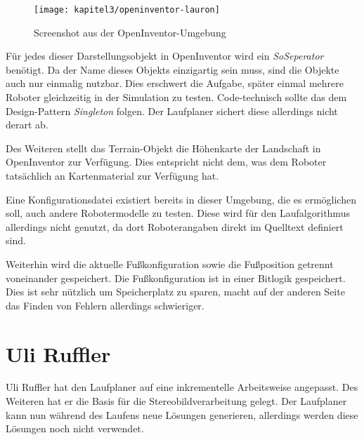\begin{figure}[t!]
  \centering
  \texttt{[image: kapitel3/openinventor-lauron]}
  \caption{Screenshot aus der OpenInventor-Umgebung}
  \label{Kap4:OpenInventorLauron}
\end{figure}

Für jedes dieser Darstellungsobjekt in OpenInventor wird ein \emph{SoSeperator} benötigt. Da der Name dieses Objekts einzigartig sein muss, sind die Objekte auch nur einmalig nutzbar. Dies erschwert die Aufgabe, später einmal mehrere Roboter gleichzeitig in der Simulation zu testen. Code-technisch sollte das dem Design-Pattern \emph{Singleton} folgen. Der Laufplaner sichert diese allerdings nicht derart ab.

Des Weiteren stellt das Terrain-Objekt die Höhenkarte der Landschaft in OpenInventor zur Verfügung. Dies entspricht nicht dem, was dem Roboter tatsächlich an Kartenmaterial zur Verfügung hat.

Eine Konfigurationsdatei existiert bereits in dieser Umgebung, die es ermöglichen soll, auch andere Robotermodelle zu testen. Diese wird für den Laufalgorithmus allerdings nicht genutzt, da dort Roboterangaben direkt im Quelltext definiert sind.

Weiterhin wird die aktuelle Fußkonfiguration sowie die Fußposition getrennt voneinander gespeichert. Die Fußkonfiguration ist in einer Bitlogik gespeichert. Dies ist sehr nützlich um Speicherplatz zu sparen, macht auf der anderen Seite das Finden von Fehlern allerdings schwieriger.

\section{Uli Ruffler}

Uli Ruffler \autocite{ruffler2006} hat den Laufplaner auf eine inkrementelle Arbeitsweise angepasst. Des Weiteren hat er die Basis für die Stereobildverarbeitung gelegt. Der Laufplaner kann nun während des Laufens neue Lösungen generieren, allerdings werden diese Lösungen noch nicht verwendet.